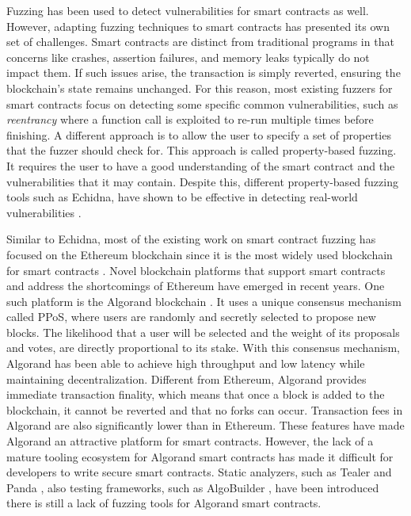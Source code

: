 Fuzzing has been used to detect vulnerabilities for smart contracts as well.
However, adapting fuzzing techniques to smart contracts has presented its own set of challenges.
Smart contracts are distinct from traditional programs in that concerns like crashes, assertion failures, and memory leaks typically do not impact them. If such issues arise, the transaction is simply reverted, ensuring the blockchain's state remains unchanged.
For this reason, most existing fuzzers for smart contracts focus on detecting some specific common vulnerabilities, such as \textit{reentrancy} where a function call is exploited to re-run multiple times before finishing.
A different approach is to allow the user to specify a set of properties that the fuzzer should check for.
This approach is called property-based fuzzing.
It requires the user to have a good understanding of the smart contract and the vulnerabilities that it may contain.
Despite this, different property-based fuzzing tools such as Echidna, have shown to be effective in detecting real-world vulnerabilities \cite{grieco_echidna_2020, noauthor_echidna_nodate}.

Similar to Echidna, most of the existing work on smart contract fuzzing has focused on the Ethereum blockchain since it is the most widely used blockchain for smart contracts \cite{guo_analysis_2022}.
Novel blockchain platforms that support smart contracts and address the shortcomings of Ethereum have emerged in recent years.
One such platform is the Algorand blockchain \cite{chen_algorand_2019}.
It uses a unique consensus mechanism called \ac{PPoS}, where users are randomly and secretly selected to propose new blocks.
The likelihood that a user will be selected and the weight of its proposals and votes, are directly proportional to its stake.
With this consensus mechanism, Algorand has been able to achieve high throughput and low latency while maintaining decentralization.
Different from Ethereum, Algorand provides immediate transaction finality, which means that once a block is added to the blockchain, it cannot be reverted and that no forks can occur.
Transaction fees in Algorand are also significantly lower than in Ethereum.
These features have made Algorand an attractive platform for smart contracts.
However, the lack of a mature tooling ecosystem for Algorand smart contracts has made it difficult for developers to write secure smart contracts.
Static analyzers, such as Tealer \cite{noauthor_crytictealer_nodate} and Panda \cite{sun_panda_2023}, also testing frameworks, such as AlgoBuilder \cite{noauthor_algo_nodate}, have been introduced there is still a lack of fuzzing tools for Algorand smart contracts.

